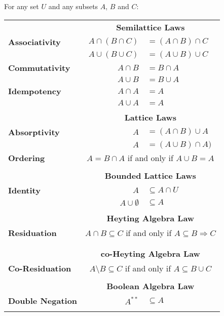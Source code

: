 \begin{laws}
	\noindent For any set $U$ and any subsets $A$, $B$ and $C$:
	
	\begin{tabular}{lr@{\,}l}
		&\multicolumn{2}{c}{\textbf{Semilattice Laws}}\\
		\textbf{Associativity}	& $A \cap (B \cap C)$ &$= (A\cap B)\cap C$\\
								& $A \cup (B \cup C)$ &$= (A\cup B)\cup C$\\
		\textbf{Commutativity}	& $A\cap B$ & $= B\cap A$\\
								& $A\cup B$ & $= B\cup  A$\\
		\textbf{Idempotency}	& $A\cap A$ & $= A$\\
								& $A\cup A$ & $= A$\\
		&&\\						
		&\multicolumn{2}{c}{\textbf{Lattice Laws}}\\		
		\textbf{Absorptivity}	& $A$ & $= (A\cap B)\cup A$\\
								& $A$ & $= (A\cup B) \cap A)$\\
		\textbf{Ordering} & \multicolumn{2}{c}{$A=B\cap A$ if and only if $A\cup B=A$}\\
		
				&&\\ 
		&\multicolumn{2}{c}{\textbf{Bounded Lattice Laws}}\\				
		\textbf{Identity}&$A$    &$\subseteq  A\cap U$\\ 								
						& $A\cup \emptyset$ & $\subseteq A$\\
		&&\\
		&\multicolumn{2}{c}{\textbf{Heyting Algebra Law}}\\								
		\textbf{Residuation} &\multicolumn{2}{c}{$A\cap B\subseteq C$ if and only if $A\subseteq B\Rightarrow C$}\\
		&&\\
		
		&&\\
		&\multicolumn{2}{c}{\textbf{co-Heyting Algebra Law}}\\								
		\textbf{Co-Residuation} &\multicolumn{2}{c}{$A\setminus B\subseteq C$ if and only if $A\subseteq B\cup C$}\\
		&&\\
		
				&\multicolumn{2}{c}{\textbf{Boolean Algebra Law}}\\					
		\textbf{Double Negation} & $A^{**}$ & $\subseteq A$ \\
		&&\\
		

\end{tabular}
\end{laws}
